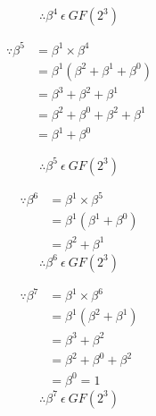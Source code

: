 \documentclass[paper=usletter, fontsize=12pt]{article}
\begin{document}
            \[ \therefore \beta^{4} \ \epsilon \ GF(2^{3}) \]

            \begin{equation*}
                \begin{split}
                    \because \beta^{5} & = \beta^{1} \times \beta^{4} \\
                    & = \beta^{1} (\beta^{2}+\beta^{1}+\beta^{0}) \\
                    & = \beta^{3}+\beta^{2}+\beta^{1} \\
                    & = \beta^{2}+\beta^{0}+\beta^{2}+\beta^{1} \\
                    & = \beta^{1}+\beta^{0}
                \end{split}
            \end{equation*}

            \[ \therefore \beta^{5} \ \epsilon \ GF(2^{3}) \]

            \begin{equation*}
                \begin{split}
                    \because \beta^{6} & = \beta^{1} \times \beta^{5} \\
                    & = \beta^{1} (\beta^{1}+\beta^{0}) \\
                    & = \beta^{2}+\beta^{1}
                \end{split}
            \end{equation*}
            \[ \therefore \beta^{6} \ \epsilon \ GF(2^{3}) \]

            \begin{equation*}
                \begin{split}
                    \because \beta^{7} & = \beta^{1} \times \beta^{6} \\
                    & = \beta^{1} (\beta^{2}+\beta^{1}) \\
                    & = \beta^{3}+\beta^{2} \\
                    & = \beta^{2}+\beta^{0}+\beta^{2} \\
                    & = \beta^{0} = 1
                \end{split}
            \end{equation*}
            \[ \therefore \beta^{7} \ \epsilon \ GF(2^{3}) \]
\end{document}
